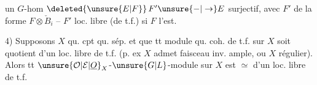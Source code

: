 un $G$-hom $\deleted{\unsure{E|F}}\,F'\unsure{-|\to}E$ surjectif, avec
$F'$ de la forme $F\otimes\check{B}_i$ --  $F'$ loc.
libre (de t.f.) si $F$ l'est.

4) Supposons $X$ qu. cpt qu. sép. et que
tt module qu. coh. de t.f. sur $X$
soit quotient d'un loc. libre de t.f.
(p. ex $X$ admet faisceau inv. ample,
ou $X$  régulier). Alors tt
$\unsure{\mathcal{O}|\mathcal{E}|\underline{O}}_X$-$\unsure{G|L}$-module sur $X$ est $\simeq$  d'un
loc. libre de t.f.
